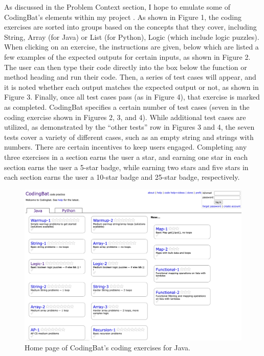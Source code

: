 \documentclass[10pt,twocolumn]{article}
\begin{document}
As discussed in the Problem Context section, I hope to emulate some of CodingBat’s elements within my project \cite{CodingBat}. As shown in Figure 1, the coding exercises are sorted into groups based on the concepts that they cover, including String, Array (for Java) or List (for Python), Logic (which include logic puzzles). When clicking on an exercise, the instructions are given, below which are listed a few examples of the expected outputs for certain inputs, as shown in Figure 2. The user can then type their code directly into the box below the function or method heading and run their code. Then, a series of test cases will appear, and it is noted whether each output matches the expected output or not, as shown in Figure 3. Finally, once all test cases pass (as in Figure 4), that exercise is marked as completed. CodingBat specifies a certain number of test cases (seven in the coding exercise shown in Figures 2, 3, and 4). While additional test cases are utilized, as demonstrated by the “other tests” row in Figures 3 and 4, the seven tests cover a variety of different cases, such as an empty string and strings with numbers. There are certain incentives to keep users engaged. Completing any three exercises in a section earns the user a star, and earning one star in each section earns the user a 5-star badge, while earning two stars and five stars in each section earns the user a 10-star badge and 25-star badge, respectively.

\begin{figure}
    \centering
    \includegraphics[width=.95\linewidth]{CodingBat0.png}
    \caption{
        Home page of CodingBat's coding exercises for Java.
    }
    \label{fig:first-page}
\end{figure}
\end{document}
